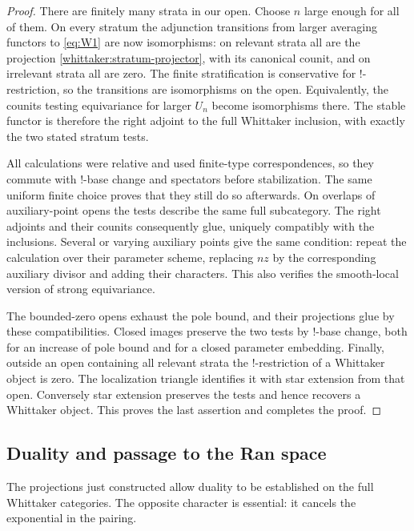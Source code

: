 \documentclass[11pt]{article}
\numberwithin{equation}{section}
\theoremstyle{definition}
\theoremstyle{remark}
\begin{document}
\begin{proof}
There are finitely many strata in our open. Choose $n$ large enough for
all of them. On every stratum the adjunction transitions from larger
averaging functors to \eqref{eq:W1} are now isomorphisms: on relevant strata
all are the projection \eqref{whittaker:stratum-projector}, with its
canonical counit, and on irrelevant strata all are zero. The finite
stratification is conservative for $!$-restriction, so the transitions are
isomorphisms on the open. Equivalently, the counits testing equivariance
for larger $U_n$ become isomorphisms there. The stable functor is therefore
the right adjoint to the full Whittaker inclusion, with exactly the two
stated stratum tests.

All calculations were relative and used finite-type correspondences, so
they commute with $!$-base change and spectators before stabilization.
The same uniform finite choice proves that they still do so afterwards.
On overlaps of auxiliary-point opens the tests describe the same full
subcategory. The right adjoints and their counits consequently glue,
uniquely compatibly with the inclusions. Several or varying auxiliary
points give the same condition: repeat the calculation over their
parameter scheme, replacing $nz$ by the corresponding auxiliary divisor
and adding their characters. This also verifies the smooth-local version
of strong equivariance.

The bounded-zero opens exhaust the pole bound, and their projections glue
by these compatibilities. Closed images preserve the two tests by
$!$-base change, both for an increase of pole bound and for a closed
parameter embedding. Finally, outside an open containing all relevant
strata the $!$-restriction of a Whittaker object is zero. The localization
triangle identifies it with star extension from that open. Conversely
star extension preserves the tests and hence recovers a Whittaker object.
This proves the last assertion and completes the proof.
\end{proof}

\subsection{Duality and passage to the Ran space}

The projections just constructed allow duality to be established on the
full Whittaker categories. The opposite character is essential: it
cancels the exponential in the pairing.
\end{document}

